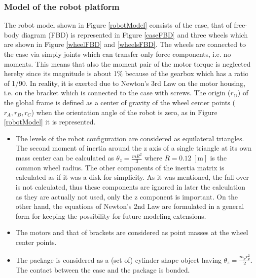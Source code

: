 \documentclass[12pt,english,twoside]{article}
\begin{document}
\subsubsection{Model of the robot platform}
The robot model shown in Figure \ref{robotModel} consists of the case, that of free-body diagram (FBD) is represented in Figure \ref{caseFBD} and three wheels which are shown in Figure \ref{wheelFBD} and \ref{wheelsFBD}. The wheels are connected to the case via simply joints which can transfer only force components, i.e. no moments. This means that also the moment pair of the motor torque is neglected hereby since its magnitude is about 1\% because of the gearbox which has a ratio of 1/90. In reality, it is exerted  due to Newton's 3rd Law on the motor housing, i.e. on the bracket which is connected to the case with screws. The origin ($r_O$) of the global frame is defined as a center of gravity of the wheel center points ($r_A,r_B,r_C$) when the orientation angle of the robot is zero, as in Figure \ref{robotModel} it is represented.
\begin{itemize}
	\item The levels of the robot configuration are considered as equilateral triangles. The second moment of inertia around the z axis of a single triangle at its own mass center can be calculated as $\theta_z=\frac{m R^2}{3}$ where $R=0.12~\left[\text{m}\right]$ is the common wheel radius. The other components of the inertia matrix is calculated as if it was a disk for simplicity. As it was mentioned, the fall over is not calculated, thus these components are ignored in later the calculation as they are actually not used, only the z component is important. On the other hand, the equations of Newton's 2nd Law are formulated in a general form for keeping the possibility for future modeling extensions.
	\item The motors and that of brackets are considered as point masses at the wheel center points.
	\item The package is considered as a (set of) cylinder shape object having $\theta_z=\frac{m_p r_p^2}{2}$. The contact between the case and the package is bonded.
\end{itemize}
\end{document}
